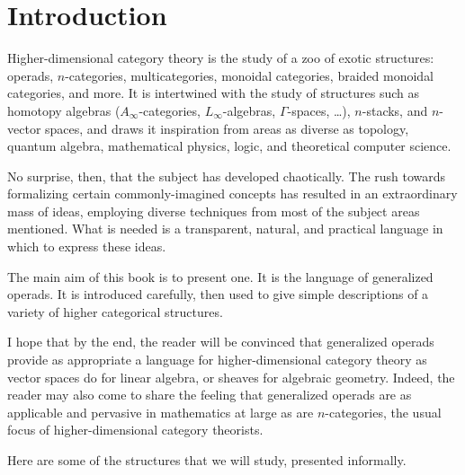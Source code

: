 
\chapter{Introduction}




\noindent
Higher-dimensional category theory is the study of a zoo of exotic
structures: operads, $n$-categories, multicategories, monoidal categories,
braided monoidal categories, and more.  It is intertwined with the study of
structures such as homotopy algebras ($A_\infty$-categories,
$L_\infty$-algebras, $\Gamma$-spaces, \ldots), $n$-stacks, and $n$-vector
spaces, and draws it inspiration from areas as diverse as topology, quantum
algebra, mathematical physics, logic, and theoretical computer science.

No surprise, then, that the subject has developed chaotically.  The rush
towards formalizing certain commonly-imagined concepts has resulted in an
extraordinary mass of ideas, employing diverse techniques from most of the
subject areas mentioned.  What is needed is a transparent, natural, and
practical language in which to express these ideas.

The main aim of this book is to present one.  It is the language of
generalized operads.  It is introduced carefully, then used to give simple
descriptions of a variety of higher categorical structures.

I hope that by the end, the reader will be convinced that generalized
operads provide as appropriate a language for higher-dimensional category
theory as vector spaces do for linear algebra, or sheaves for algebraic
geometry.  Indeed, the reader may also come to share the feeling that
generalized operads are as applicable and pervasive in mathematics at large
as are $n$-categories, the usual focus of higher-dimensional category
theorists.

Here are some of the structures that we will study, presented informally.

